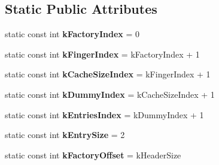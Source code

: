 \subsection*{Static Public Attributes}
\begin{DoxyCompactItemize}
\item 
\hypertarget{classv8_1_1internal_1_1_j_s_function_result_cache_a38a1ce93324544f8685ce73801714982}{}static const int {\bfseries k\+Factory\+Index} = 0\label{classv8_1_1internal_1_1_j_s_function_result_cache_a38a1ce93324544f8685ce73801714982}

\item 
\hypertarget{classv8_1_1internal_1_1_j_s_function_result_cache_aed962139257321c760e467d6a93292e3}{}static const int {\bfseries k\+Finger\+Index} = k\+Factory\+Index + 1\label{classv8_1_1internal_1_1_j_s_function_result_cache_aed962139257321c760e467d6a93292e3}

\item 
\hypertarget{classv8_1_1internal_1_1_j_s_function_result_cache_ae6564bc0896cc2868f799dc69b4f8889}{}static const int {\bfseries k\+Cache\+Size\+Index} = k\+Finger\+Index + 1\label{classv8_1_1internal_1_1_j_s_function_result_cache_ae6564bc0896cc2868f799dc69b4f8889}

\item 
\hypertarget{classv8_1_1internal_1_1_j_s_function_result_cache_a2ccc5e5d859fe12def93de99ba2c09fb}{}static const int {\bfseries k\+Dummy\+Index} = k\+Cache\+Size\+Index + 1\label{classv8_1_1internal_1_1_j_s_function_result_cache_a2ccc5e5d859fe12def93de99ba2c09fb}

\item 
\hypertarget{classv8_1_1internal_1_1_j_s_function_result_cache_a1e3a85bdec1703966eaa417caa0bca09}{}static const int {\bfseries k\+Entries\+Index} = k\+Dummy\+Index + 1\label{classv8_1_1internal_1_1_j_s_function_result_cache_a1e3a85bdec1703966eaa417caa0bca09}

\item 
\hypertarget{classv8_1_1internal_1_1_j_s_function_result_cache_a6a9ad7975af3443168c9e55db009e982}{}static const int {\bfseries k\+Entry\+Size} = 2\label{classv8_1_1internal_1_1_j_s_function_result_cache_a6a9ad7975af3443168c9e55db009e982}

\item 
\hypertarget{classv8_1_1internal_1_1_j_s_function_result_cache_ac35317eaeac39632ec2fd9b6e375f358}{}static const int {\bfseries k\+Factory\+Offset} = k\+Header\+Size\label{classv8_1_1internal_1_1_j_s_function_result_cache_ac35317eaeac39632ec2fd9b6e375f358}


\end{DoxyCompactItemize}
